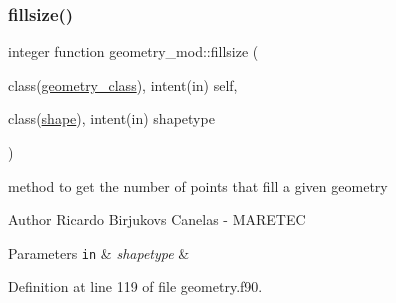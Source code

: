 \mbox{\label{namespacegeometry__mod_a92602e1198d3607613ea2722fb002685}} 
\subsubsection{\texorpdfstring{fillsize()}{fillsize()}}
{\footnotesize\ttfamily integer function geometry\+\_\+mod\+::fillsize (\begin{DoxyParamCaption}\item[{class(\mbox{\hyperlink{structgeometry__mod_1_1geometry__class}{geometry\+\_\+class}}), intent(in)}]{self,  }\item[{class(\mbox{\hyperlink{structgeometry__mod_1_1shape}{shape}}), intent(in)}]{shapetype }\end{DoxyParamCaption})\hspace{0.3cm}{\ttfamily [private]}}



method to get the number of points that fill a given geometry 

\begin{DoxyAuthor}{Author}
Ricardo Birjukovs Canelas -\/ M\+A\+R\+E\+T\+EC
\end{DoxyAuthor}

\begin{DoxyParams}[1]{Parameters}
\mbox{\tt in}  & {\em shapetype} & \\
\hline
\end{DoxyParams}


Definition at line 119 of file geometry.\+f90.


